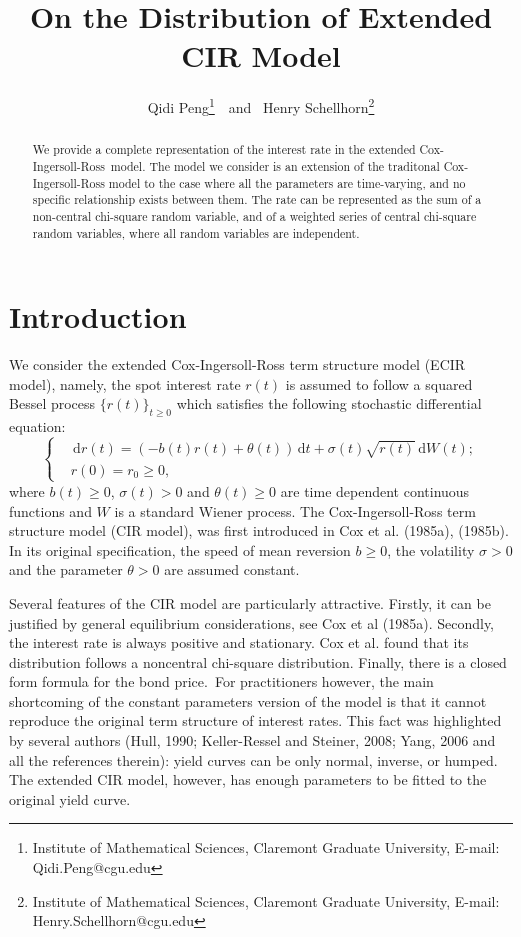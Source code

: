 \documentclass[6pt]{article}
\def\ud{\, \mathrm{d}}
\numberwithin{equation}{section}
\begin{document}
\title{On the Distribution of Extended CIR Model}
\author{Qidi Peng\footnote{Institute of Mathematical Sciences, Claremont Graduate University, E-mail: Qidi.Peng@cgu.edu}~~and~ Henry Schellhorn\footnote{Institute of Mathematical Sciences, Claremont Graduate University, E-mail: Henry.Schellhorn@cgu.edu}}
\date{}
\maketitle

\begin{abstract}
We provide a complete representation of the interest rate in the extended
Cox-Ingersoll-Ross\ model. The model we consider is an extension of the
traditonal Cox-Ingersoll-Ross model to the case where all the parameters are
time-varying, and no specific relationship exists between them. The rate can
be represented as the sum of a non-central chi-square random variable, and
of a weighted series of central chi-square random variables, where all
random variables are independent.
\end{abstract}

\section{Introduction}
We consider the extended Cox-Ingersoll-Ross term structure model (ECIR model), namely, the spot interest
rate $r(t)$ is assumed to follow a squared Bessel process $\{r(t)\}_{t\ge0}$ which satisfies the following stochastic differential equation:
\begin{equation}
\label{CIR}
\left\{\begin{array}{ll}
&\ud r(t)=(-b(t)r(t)+\theta(t))\ud t+\sigma(t)\sqrt{r(t)}\ud W(t);\\
&r(0)=r_0\ge0,
\end{array}\right.
\end{equation}
where $b(t)\ge0$, $\sigma(t) >0$ and $\theta(t)\ge0 $ are time dependent continuous functions and $W$ is a standard Wiener process. The Cox-Ingersoll-Ross term structure model (CIR model), was first introduced in Cox et al. (1985a), (1985b).  In its original specification, the speed of mean reversion $b\geq 0$, the volatility $%
\sigma >0$ and the parameter $\theta >0$ are assumed constant.

Several features of the CIR model are particularly attractive. Firstly, it
can be justified by general equilibrium considerations, see Cox et al
(1985a). Secondly, the interest rate is always positive and stationary. Cox
et al. found that its distribution follows a noncentral chi-square
distribution. Finally, there is a closed form formula for the bond price.\
For practitioners however, the main shortcoming of the constant parameters
version of the model is that it cannot reproduce the original term structure
of interest rates. This fact was highlighted by several authors (Hull, 1990; Keller-Ressel and Steiner, 2008; Yang, 2006 and all the references
therein): yield curves can be only normal, inverse, or humped. The extended
CIR model, however, has enough parameters to be fitted to the original yield
curve.
\end{document}
